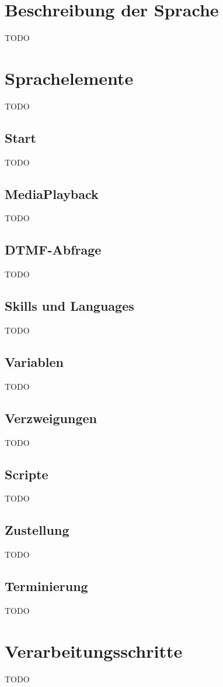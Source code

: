 \section{Beschreibung der Sprache}
TODO

\section{Sprachelemente}
TODO

\subsection{Start}
TODO

\subsection{MediaPlayback}
TODO

\subsection{DTMF-Abfrage}
TODO

\subsection{Skills und Languages}
TODO

\subsection{Variablen}
TODO

\subsection{Verzweigungen}
TODO

\subsection{Scripte}
TODO

\subsection{Zustellung}
TODO

\subsection{Terminierung}
TODO

\section{Verarbeitungsschritte}
TODO
